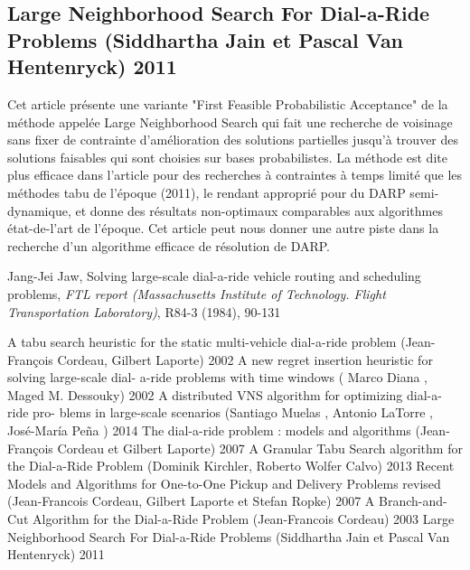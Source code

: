 \documentclass[10pt,a4paper]{report}
\begin{document}
\subsection*{Large Neighborhood Search For Dial-a-Ride Problems (Siddhartha Jain et Pascal Van Hentenryck) 2011}
Cet article présente une variante "First Feasible Probabilistic Acceptance" de la méthode appelée Large Neighborhood Search qui fait une recherche de voisinage sans fixer de contrainte d'amélioration des solutions partielles jusqu'à trouver des solutions faisables qui sont choisies sur bases probabilistes. La méthode est dite plus efficace dans l'article pour des recherches à contraintes à temps limité que les méthodes tabu de l'époque (2011), le rendant approprié pour du DARP semi-dynamique, et donne des résultats non-optimaux comparables aux algorithmes état-de-l'art de l'époque. 
Cet article peut nous donner une autre piste dans la recherche d'un algorithme efficace de résolution de DARP.
\begin{thebibliography}{10}
Jang-Jei Jaw, Solving large-scale dial-a-ride vehicle routing and scheduling problems,  \textit{FTL report (Massachusetts Institute of Technology. Flight Transportation Laboratory)}, R84-3 (1984), 90-131


\bibitem{} 
A tabu search heuristic for the static multi-vehicle
dial-a-ride problem (Jean-François Cordeau, Gilbert Laporte) 2002
\bibitem{}
A new regret insertion heuristic for solving large-scale dial-
a-ride problems with time windows ( Marco Diana , Maged
M. Dessouky) 2002
\bibitem{}
A distributed VNS algorithm for optimizing dial-a-ride pro-
blems in large-scale scenarios (Santiago Muelas , Antonio
LaTorre , José-María Peña ) 2014
\bibitem{}
The dial-a-ride problem : models and algorithms (Jean-
François Cordeau et Gilbert Laporte) 2007
\bibitem{}
A Granular Tabu Search algorithm for the Dial-a-Ride Problem (Dominik Kirchler, Roberto Wolfer Calvo) 2013
\bibitem{}
Recent Models and Algorithms for One-to-One Pickup and
Delivery Problems revised (Jean-Francois Cordeau, Gilbert
Laporte et Stefan Ropke) 2007
\bibitem{}
A Branch-and-Cut Algorithm for the Dial-a-Ride Problem
(Jean-Francois Cordeau) 2003
\bibitem{}
Large Neighborhood Search For Dial-a-Ride Problems (Siddhartha Jain et Pascal Van Hentenryck) 2011

\end{thebibliography}
\end{document}
